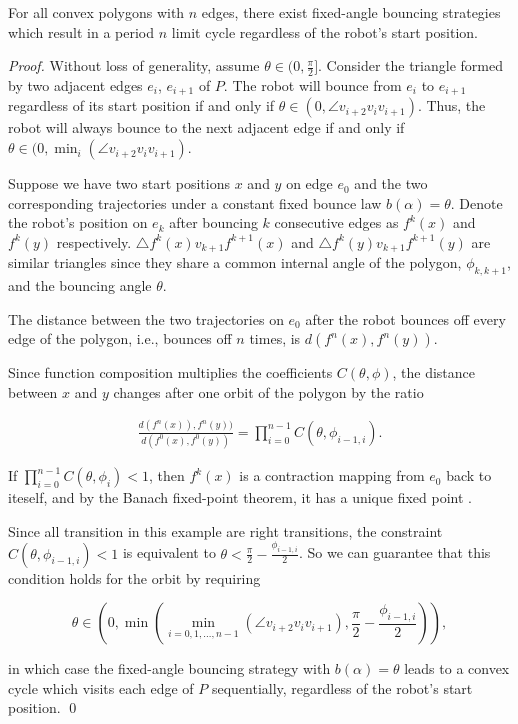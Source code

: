 \documentclass[]{styles/svproc}  %
\begin{document}
\begin{theorem} \label{thm:convex}
For all convex polygons with $n$ edges, there exist fixed-angle bouncing
strategies which result in a period $n$ limit cycle regardless of the robot's start position.
\end{theorem}
\begin{proof}

Without loss of generality, assume $\theta \in (0, \frac{\pi}{2}]$. Consider the
triangle formed by two adjacent edges $e_i$, $e_{i+1}$ of $P$. The robot will
bounce from $e_i$ to $e_{i+1}$ regardless of its start position if and only if
$\theta \in (0, \angle v_{i+2}v_{i}v_{i+1})$. Thus, the robot will always bounce
to the next adjacent edge if and only if
$\theta \in (0, \min_{i}(\angle v_{i+2}v_{i}v_{i+1})$.

Suppose we have two start positions $x$ and $y$ on edge $e_0$ and the two
corresponding trajectories under a constant fixed bounce law $b(\alpha) = \theta$. Denote the robot's
position on $e_k$ after bouncing $k$ consecutive edges as $f^{k}(x)$ and
$f^{k}(y)$ respectively. $\triangle f^{k}(x)v_{k+1}f^{k+1}(x)$ and
$\triangle f^{k}(y)v_{k+1}f^{k+1}(y)$ are similar triangles since they share a
common internal angle of the polygon, $\phi_{k,k+1}$, and the bouncing angle
$\theta$.

The distance between the two trajectories on $e_0$ after the robot bounces off
every edge of the polygon, i.e., bounces off $n$ times, is
$d(f^{n}(x), f^{n}(y))$.

Since function composition multiplies the coefficients $C(\theta, \phi)$, 
the distance between $x$ and $y$ changes after one orbit of the polygon by the
ratio

\begin{eqnarray*}
\frac{d(f^{n}(x)), f^{n}(y))}{d(f^{0}(x), f^{0}(y))} = \prod_{i = 0}^{n-1}
C(\theta, \phi_{i-1, i}).
\end{eqnarray*}

If $\prod_{i = 0}^{n-1} C(\theta, \phi_{i}) < 1$, then $f^k(x)$ is a contraction
mapping from $e_0$ back to iteself, and by the Banach fixed-point theorem, it
has a unique fixed point \cite{Granas2003}.

Since all transition in this example are right transitions, the constraint $C(\theta,\phi_{i-1, i})<1$ is equivalent to $\theta < \frac{\pi}{2}-\frac{\phi_{i-1, i}}{2}$. So we can guarantee that this condition holds for the orbit by requiring

\begin{equation*}
\theta \in (0, \min(\min_{i = 0, 1, \dots, n-1}(\angle v_{i+2}v_{i}v_{i+1}),
\frac{\pi}{2}-\frac{\phi_{i-1, i}}{2})),
\end{equation*}

\noindent
in which case the fixed-angle bouncing strategy with $b(\alpha) = \theta$ leads to a convex
cycle which visits each edge of $P$ sequentially, regardless of the robot's start position.
\qed

\end{proof}
\end{document}
